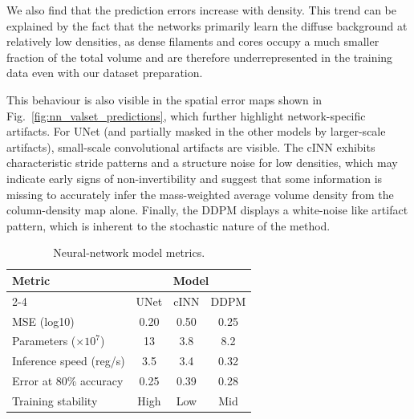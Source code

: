 \documentclass{aa}
\begin{document}
   We also find that the prediction errors increase with density. 
   This trend can be explained by the fact that the networks primarily learn the diffuse background at relatively low densities, as dense filaments and cores occupy a much smaller fraction of the total volume and are therefore underrepresented in the training data even with our dataset preparation.

   This behaviour is also visible in the spatial error maps shown in Fig.~\ref{fig:nn_valset_predictions}, which further highlight network-specific artifacts.
   For UNet (and partially masked in the other models by larger-scale artifacts), small-scale convolutional artifacts are visible.
   The cINN exhibits characteristic stride patterns and a structure noise for low densities, which may indicate early signs of non-invertibility and suggest that some information is missing to accurately infer the mass-weighted average volume density from the column-density map alone.
   Finally, the DDPM displays a white-noise like artifact pattern, which is inherent to the stochastic nature of the method.

   \begin{table}[!ht]
      \centering
      \begin{tabular}{lccc}
         \hline
         Metric & \multicolumn{3}{c}{Model} \\
         \cline{2-4}
         & UNet & cINN & DDPM \\
         \hline
         MSE (log10) & 0.20 & 0.50 & 0.25 \\
         Parameters ($\times 10^{7}$) & 13 & 3.8 & 8.2 \\
         Inference speed (reg/s) & 3.5 & 3.4 & 0.32 \\
         Error at 80\% accuracy & 0.25 & 0.39 & 0.28 \\
         Training stability & High & Low & Mid \\
         \end{tabular}
      \caption{Neural-network model metrics.}
      \label{tab:nn_metrics}
   \end{table}
\end{document}
